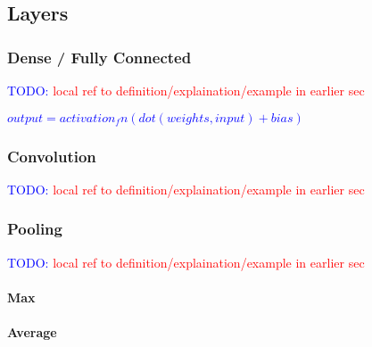 \subsection{Layers}

\subsubsection{Dense / Fully Connected}

\textcolor{blue}{TODO: \textcolor{red}{local ref to definition/explaination/example in earlier sec}}

\textcolor{blue}{$output = activation_fn(dot(weights, input) + bias)$}

\subsubsection{Convolution}

\textcolor{blue}{TODO: \textcolor{red}{local ref to definition/explaination/example in earlier sec}}

\subsubsection{Pooling}

\textcolor{blue}{TODO: \textcolor{red}{local ref to definition/explaination/example in earlier sec}}

\paragraph{Max}

\paragraph{Average}
